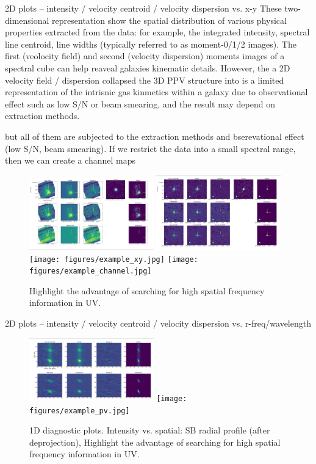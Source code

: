 \documentclass[twocolumn,tighten]{aastex62}
\begin{document}
2D plots -- intensity / velocity centroid / velocity dispersion  vs. x-y
These two-dimensional representation show the spatial distribution of various physical properties extracted from the data: for example, the integrated intensity, spectral line centroid, line widths (typically referred to as moment-0/1/2 images).
The first (veolocity field) and second (velocity dispersion) moments images of a spectral cube can help reaveal galaxies kinematic details. However, the a 2D velocity field / dispersion collapsed the 3D PPV structure into  is a limited representation of the intrisnic gas kinmetics within a galaxy due to observational effect such as low S/N or beam smearing, and the result may depend on extraction methods.

 but all of them are subjected to the extraction methods and bserevational effect (low S/N, beam smearing).
If we restrict the data into a small spectral range, then we can create a channel maps
\begin{figure}%
\centering
\includegraphics[width=0.48\textwidth]{figures/bx610-sinfoni-xy.jpeg}
\includegraphics[width=0.48\textwidth]{figures/bx610-alma-xy.jpeg}
\texttt{[image: figures/example\_xy.jpg]}
\texttt{[image: figures/example\_channel.jpg]}
\caption{Highlight the advantage of searching for high spatial frequency information in UV.
}
\end{figure}


2D plots -- intensity / velocity centroid / velocity dispersion  vs. r-freq/wavelength

\begin{figure}%
\centering
\includegraphics[width=0.48\textwidth]{figures/bx610-alma-pv.jpeg}
\texttt{[image: figures/example\_pv.jpg]}
\caption{1D diagnostic plots. Intensity vs. spatial: SB radial profile (after deprojection), Highlight the advantage of searching for high spatial frequency information in UV.
}
\end{figure}
\end{document}
